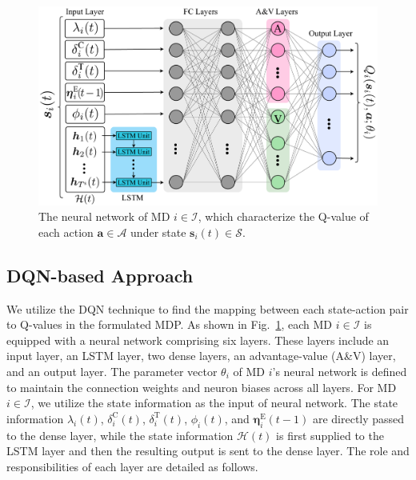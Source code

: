 \documentclass[10pt, journal,letterpaper]{IEEEtran}
\begin{document}
\begin{figure}
	\centering
	\includegraphics[width=1\linewidth]{ DQN}
	\captionsetup{name=Fig.}
	\vspace*{-6mm}
	\caption{The neural network of MD $i \in \mathcal{I}$, which characterize the Q-value of each action $\boldsymbol{a} \in \mathcal{A}$ under state $\boldsymbol{s}_i(t) \in \mathcal{S}$.}
	\vspace*{-4.5mm}
	\label{DQN}
\end{figure}


\subsection{DQN-based Approach}
We utilize the DQN technique to find the mapping between each state-action pair to Q-values in the formulated MDP. As shown in Fig.~\ref{DQN}, each MD $i \in \mathcal{I}$ is equipped with a neural network comprising six layers. These layers include an input layer, an LSTM layer, two dense layers, an advantage-value (A\&V) layer, and an output layer. The parameter vector $\theta_i$ of MD $i$'s neural network is defined to maintain the connection weights and neuron biases across all layers. For MD $i \in \mathcal{I}$, we utilize the state information as the input of neural network. The state information $\lambda_i(t)$, $\delta_i^{\text{C}}(t)$, $\delta_i^{\text{T}}(t)$, $\phi_i(t)$, and $\boldsymbol{\eta}_i^{\text{E}}(t-1)$ are directly passed to the dense layer, while the state information $\mathcal{H}(t)$ is first supplied to the LSTM layer and then the resulting output is sent to the dense layer. The role and responsibilities of each layer are detailed as follows.
\end{document}
